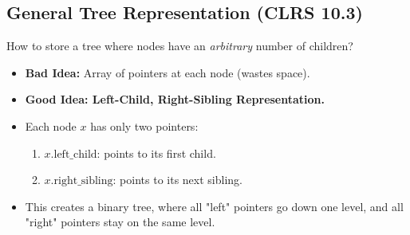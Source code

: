 \subsection{General Tree Representation (CLRS 10.3)}
How to store a tree where nodes have an \textit{arbitrary} number of children?
\begin{itemize}
    \item \textbf{Bad Idea:} Array of pointers at each node (wastes space).
    \item \textbf{Good Idea: Left-Child, Right-Sibling Representation.}
    \item Each node $x$ has only two pointers:
    \begin{enumerate}
        \item $x.\text{left\_child}$: points to its first child.
        \item $x.\text{right\_sibling}$: points to its next sibling.
    \end{enumerate}
    \item This creates a binary tree, where all "left" pointers go down one level, and all "right" pointers stay on the same level.
\end{itemize}